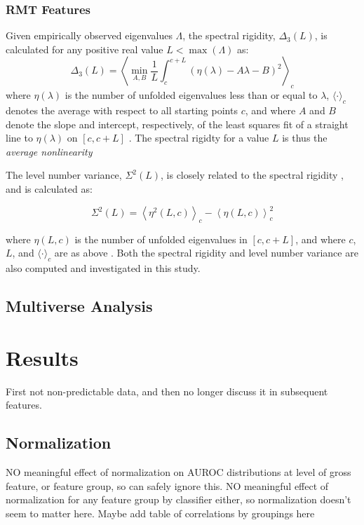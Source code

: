 \documentclass[12pt]{spieman}  %
\begin{document}
\begin{spacing}{2}
\subsubsection{RMT Features}
Given empirically observed eigenvalues \(\Lambda\), the spectral rigidity, \(\Delta_3(L)\), is
calculated for any positive real value \(L < \max(\Lambda)\) as:
\[
\Delta_3(L) = \left \langle \min_{A,B} \frac{1}{L} \int_c^{c+L} \left(  \eta(\lambda) -A \lambda - B \right)^2 \right \rangle_c
\]
where \(\eta(\lambda)\) is the number of unfolded eigenvalues less than or equal to \(\lambda\),
\(\langle \cdot \rangle_c\) denotes the average with respect to all starting points \(c\), and where
\(A\) and \(B\) denote the slope and intercept, respectively, of the least squares fit of a straight
line to \(\eta(\lambda)\) on \([c, c+L]\) \cite{guhrRandommatrixTheoriesQuantum1998a}. The spectral
rigidty for a value \(L\) is thus the \textit{average nonlinearity}


The level
number variance, \(\Sigma^2(L)\), is closely related to the spectral rigidity
\cite{mehtaRandomMatrices2004}, and is calculated as:

\[
\Sigma^2(L) = \left\langle \eta^2(L, c) \right\rangle_c - \left\langle \eta(L, c) \right\rangle^2_c
\]

where \(\eta(L, c)\) is the number of unfolded eigenvalues in \([c, c+ L]\), and where \(c\), \(L\),
and \(\langle \cdot \rangle_c\) are as above \cite{guhrRandommatrixTheoriesQuantum1998a}. Both the
spectral rigidity and level number variance are also computed and investigated in this study.

\subsection{Multiverse Analysis}
\label{sec:multiverse}

\section{Results}
\label{sec:results}

First not non-predictable data, and then no longer discuss it in subsequent features.

\subsection{Normalization}
NO meaningful effect of normalization on AUROC distributions at level of gross feature, or feature
group, so can safely ignore this.
NO meaningful effect of normalization for any feature group by classifier either, so
normalization doesn't seem to matter here.
Maybe add table of correlations by groupings here


\end{spacing}
\end{document}

